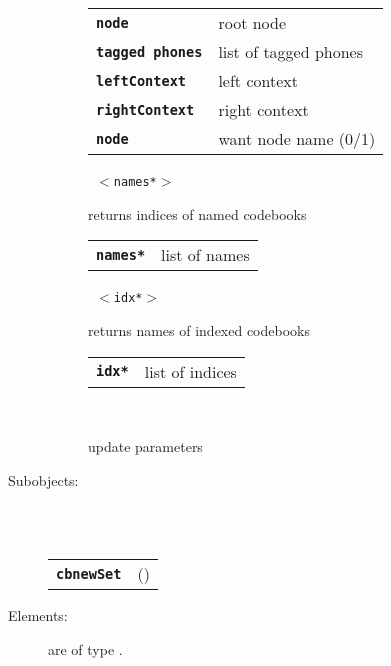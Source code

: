 \begin{description}
\begin{description}
      \begin{tabular}{ll}
 \texttt{\textbf{node}} &           root node \\
 \texttt{\textbf{tagged phones}} &  list of tagged phones \\
 \texttt{\textbf{leftContext}} &    left  context  \\
 \texttt{\textbf{rightContext}} &   right context  \\
 \texttt{\textbf{node}} &            want node name (0/1)  \\
      \end{tabular}
       \texttt{ $<$names*$>$} \

        returns indices of named codebooks

      \begin{tabular}{ll}
 \texttt{\textbf{names*}} & list of names \\
      \end{tabular}
       \texttt{ $<$idx*$>$} \

        returns names of indexed codebooks

      \begin{tabular}{ll}
 \texttt{\textbf{idx*}} & list of indices \\
      \end{tabular}
       \texttt{} \

        update parameters

    \end{description}

  \item[Subobjects:] \hfill \\
\ 
    \begin{tabular}{ll}
      \texttt{\textbf{cbnewSet}} & (\Jref{module}{CBNewSet}) \\
    \end{tabular}
\vspace{3mm}

  \item[Elements:] are of type .


\end{description}

